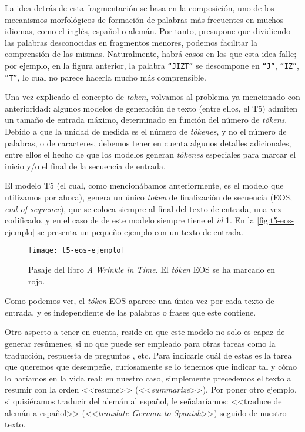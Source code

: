 La idea detrás de esta fragmentación se basa en la composición, uno de los mecanismos morfológicos de formación de palabras más frecuentes \cite{cetnarowska05} en muchos idiomas, como el inglés, español o alemán. Por tanto, presupone que dividiendo las palabras desconocidas en fragmentos menores, podemos facilitar la comprensión de las mismas. Naturalmente, habrá casos en los que esta idea falle; por ejemplo, en la figura anterior, la palabra \texttt{``JIZT''} se descompone en \texttt{``J''}, \texttt{``IZ''}, \texttt{``T''}, lo cual no parece hacerla mucho más comprensible.

Una vez explicado el concepto de \emph{token}, volvamos al problema ya mencionado con anterioridad: algunos modelos de generación de texto (entre ellos, el T5) admiten un tamaño de entrada máximo, determinado en función del número de \emph{tókens}. Debido a que la unidad de medida es el número de \emph{tókenes}, y no el número de palabras, o de caracteres, debemos tener en cuenta algunos detalles adicionales, entre ellos el hecho de que los modelos generan \emph{tókenes} especiales para marcar el inicio y/o el final de la secuencia de entrada.

El modelo T5 (el cual, como mencionábamos anteriormente, es el modelo que utilizamos por ahora), genera un único \emph{token} de finalización de secuencia (EOS, \emph{end-of-sequence}), que se coloca siempre al final del texto de entrada, una vez codificado, y en el caso de de este modelo siempre tiene el \emph{id} 1. En la \autoref{fig:t5-eos-ejemplo} se presenta un pequeño ejemplo con un texto de entrada.

\begin{figure}[h]
	\centering
	\texttt{[image: t5-eos-ejemplo]}
	\caption[Ejempo de codificación del texto.]{Pasaje del libro \emph{A Wrinkle in Time}. El \emph{tóken} EOS se ha marcado en rojo.}
	\label{fig:t5-eos-ejemplo}
\end{figure}

Como podemos ver, el \emph{tóken} EOS aparece una única vez por cada texto de entrada, y es independiente de las palabras o frases que este contiene.

Otro aspecto a tener en cuenta, reside en que este modelo no solo es capaz de generar resúmenes, si no que puede ser empleado para otras tareas como la traducción, respuesta de preguntas \cite{raffel19}, etc. Para indicarle cuál de estas es la tarea que queremos que desempeñe, curiosamente se lo tenemos que indicar tal y cómo lo haríamos en la vida real; en nuestro caso, simplemente precedemos el texto a resumir con la orden <<resume>> (<<\emph{summarize}>>). Por poner otro ejemplo, si quisiéramos traducir del alemán al español, le señalaríamos: <<traduce de alemán a español>> (<<\emph{translate German to Spanish}>>) seguido de nuestro texto.

